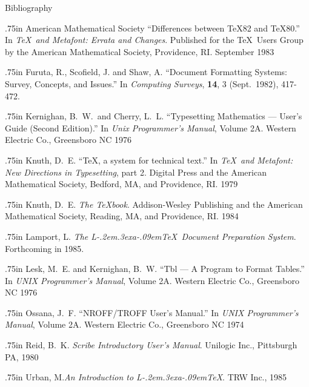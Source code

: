 \vfil\eject
{\parindent=0pt\parskip=10pt
\frenchspacing
\centerline{\twelveb Bibliography}
\vskip 8pt

\def\Hpar{\par\hangindent .75in}
\Hpar
{\csc American Mathematical Society} 
``Differences between \TeX82 and \TeX80.'' In {\sl \TeX\ and Metafont:
Errata and Changes}. Published for the \TeX\ Users Group by the American
Mathematical Society, Providence, RI. September 1983

\Hpar
{\csc Furuta, R., Scofield, J. {\rm and} Shaw, A.} ``Document Formatting
Systems: Survey, Concepts, and Issues.'' In {\sl Computing Surveys\/},
{\bf 14}, 3 (Sept.~1982), 417-472.

\Hpar
{\csc Kernighan, B.~W.~{\rm and} Cherry, L.~L.} ``Typesetting
Mathematics --- User's Guide (Second Edition).'' In {\sl Unix Programmer's
Manual\/}, Volume 2A.  Western Electric Co., Greensboro NC 1976

\Hpar
{\csc Knuth, D.~E.} ``\TeX, a system for technical text.'' In {\sl \TeX\ and
Metafont: New Directions in Typesetting\/}, part 2.  Digital Press
and the American Mathematical Society, Bedford, MA, and
Providence, RI.  1979

\Hpar
{\csc Knuth, D.~E.}
{\sl The \TeX book\/}.  Addison-Wesley Publishing and the
American Mathematical Society, Reading, MA, and Providence, RI.
1984

\Hpar
{\csc Lamport, L.}
{\sl The
L\kern-.2em\raise.3ex\hbox{\csc a}\kern-.09em\TeX\
Document Preparation System}.  Forthcoming in 1985.

\Hpar
{\csc Lesk, M.~E. {\rm and} Kernighan, B.~W.} ``Tbl --- A Program
to Format Tables.'' In {\sl UNIX Programmer's
Manual\/}, Volume 2A.  Western Electric Co., Greensboro NC 1976

\Hpar
{\csc Ossana, J.~F.} ``NROFF/TROFF User's Manual.'' In {\sl UNIX Programmer's
Manual\/}, Volume 2A.  Western Electric Co., Greensboro NC 1974

\Hpar
{\csc Reid, B.~K.} {\sl Scribe Introductory User's Manual\/}.  Unilogic
Inc., Pittsburgh PA, 1980

\Hpar
{\csc Urban, M.}{\sl An Introduction to
L\kern-.2em\raise.3ex\hbox{\csc a}\kern-.09em\TeX}.  TRW Inc., 1985

}
\PrintTOC
\bye
